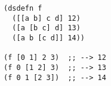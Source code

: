 \begin{lstlisting}[style=reclojureClojure,frame=single]
(dsdefn f 
  ([[a b] c d] 12)
  ([a [b c] d] 13)
  ([a b [c d]] 14))

(f [0 1] 2 3)  ;; --> 12
(f 0 [1 2] 3)  ;; --> 13
(f 0 1 [2 3])  ;; --> 14
\end{lstlisting}
